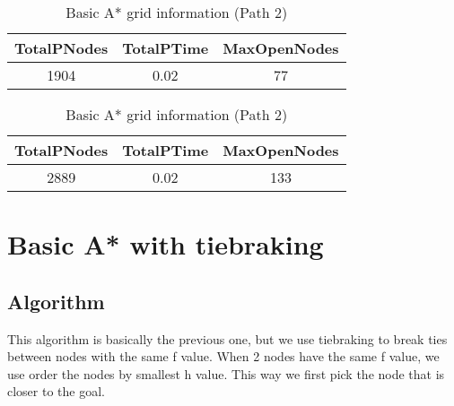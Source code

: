 \documentclass{article}
\begin{document}
  \begin{table}[h!]
    \parbox{.45\linewidth}{
        \centering
        \caption{Basic A* grid information (Path 1)}
        \label{tab:tableA*Grid1}
        \begin{tabular}{c|c|c}
          \textbf{TotalPNodes} & \textbf{TotalPTime} & \textbf{MaxOpenNodes}\\
          \hline
          1904 & 0.02 & 77\\
        \end{tabular}
    }
    \hfil
    \parbox{.45\linewidth}{
        \centering
        \caption{Basic A* grid information (Path 2)}
        \label{tab:tableA*Grid2}
        \begin{tabular}{c|c|c}
          \textbf{TotalPNodes} & \textbf{TotalPTime} & \textbf{MaxOpenNodes}\\
          \hline
          2889 & 0.02 & 133\\
        \end{tabular}
    }
  \end{table}

  \section{Basic A* with tiebraking}
  \subsection{Algorithm}
  This algorithm is basically the previous one, but we use tiebraking to break ties between nodes with the same f value. When 2 nodes have the same f value, 
  we use order the nodes by smallest h value. This way we first pick the node that is closer to the goal.\\
\end{document}
